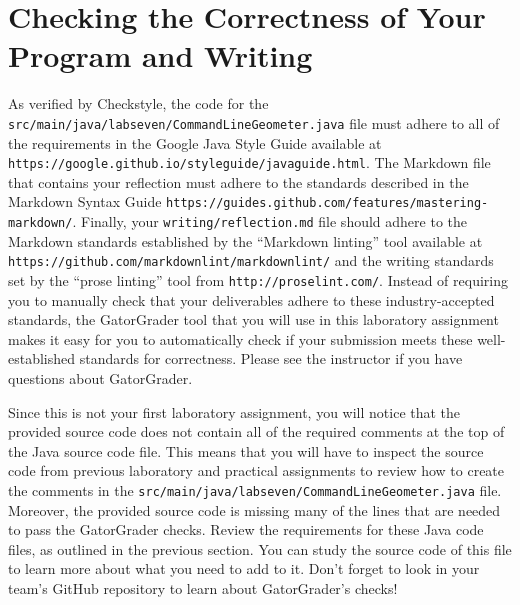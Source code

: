 \documentclass[11pt]{article}
\newcommand{\mainprogramsource}{\lstinline{src/main/java/labseven/CommandLineGeometer.java}}
\newcommand{\reflection}{\lstinline{writing/reflection.md}}
\newcommand{\url}[1]{\lstinline{#1}}
\newcommand{\step}[1]{``{#1}''}
\begin{document}
\section*{Checking the Correctness of Your Program and Writing}

As verified by Checkstyle, the code for the \mainprogramsource{} file must
adhere to all of the requirements in the Google Java Style Guide available at
\url{https://google.github.io/styleguide/javaguide.html}. The Markdown file that
contains your reflection must adhere to the standards described in the Markdown
Syntax Guide \url{https://guides.github.com/features/mastering-markdown/}.
Finally, your \reflection{} file should adhere to the Markdown standards
established by the \step{Markdown linting} tool available at
\url{https://github.com/markdownlint/markdownlint/} and the writing standards
set by the \step{prose linting} tool from \url{http://proselint.com/}. Instead
of requiring you to manually check that your deliverables adhere to these
industry-accepted standards, the GatorGrader tool that you will use in this
laboratory assignment makes it easy for you to automatically check if your
submission meets these well-established standards for correctness. Please see
the instructor if you have questions about GatorGrader.

Since this is not your first laboratory assignment, you will notice that the
provided source code does not contain all of the required comments at the top of
the Java source code file. This means that you will have to inspect the source
code from previous laboratory and practical assignments to review how to create
the comments in the \mainprogramsource{} file. Moreover, the provided source
code is missing many of the lines that are needed to pass the GatorGrader
checks. Review the requirements for these Java code files, as outlined in the
previous section. You can study the source code of this file to learn more about
what you need to add to it. Don't forget to look in your team's GitHub
repository to learn about GatorGrader's checks!
\end{document}
